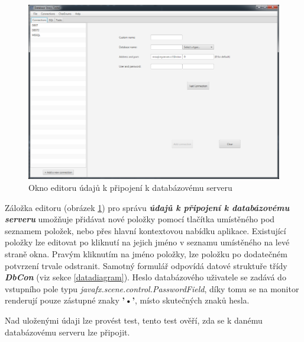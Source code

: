 \documentclass[czech,bachelor,public,dept460,male,cpdeclaration,twoside]{diploma}
\begin{document}
\begin{figure}[!htbp]\centering\includegraphics[width=1.0\textwidth]{Figures/coneditor.png}\caption{Okno editoru údajů k připojení k databázovému serveru}\label{coneditor}
\end{figure}
Záložka editoru (obrázek \ref{coneditor}) pro správu \textbf{\emph{údajů k připojení k databázovému serveru}} umožňuje přidávat nové položky pomocí tlačítka umístěného pod seznamem položek, nebo přes hlavní kontextovou nabídku aplikace. Existující položky lze editovat po kliknutí na jejich jméno v seznamu umístěného na levé straně okna. Pravým kliknutím na jméno položky, lze položku po dodatečném potvrzení trvale odstranit. Samotný formulář odpovídá datové struktuře třídy \textbf{\emph{DbCon}} (viz sekce \ref{datadiagram}). Heslo databázového uživatele se zadává do vstupního pole typu \textit{javafx.scene.control.PasswordField}, díky tomu se na monitor renderují pouze zástupné znaky \textbf{'•'}, místo skutečných znaků hesla.

Nad uloženými údaji lze provést test, tento test ověří, zda se k danému databázovému serveru lze připojit.
\end{document}
